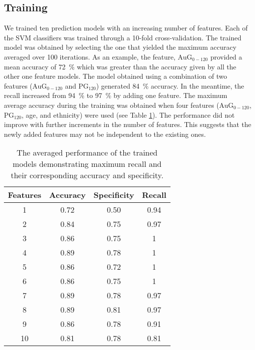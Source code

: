 \documentclass[a4paper,twoside]{article}
\begin{document}
\subsection{Training}
%
We trained ten prediction models with an increasing number of features. Each of the SVM classifiers was trained through a 10-fold cross-validation. The trained model was obtained by selecting the one that yielded the maximum accuracy averaged over \num{100} iterations. As an example, the feature, $\textrm{AuG}_{0-120}$ provided a mean accuracy of \SI{72}{\percent} which was greater than the accuracy given by all the other one feature models. The model obtained using a combination of two features ($\textrm{AuG}_{0-120}$ and $\textrm{PG}_{120}$) generated \SI{84}{\percent} accuracy. In the meantime, the recall increased from \SI{94}{\percent} to \SI{97}{\percent} by adding one feature. The maximum average accuracy during the training was obtained when four features ($\textrm{AuG}_{0-120}$, $\textrm{PG}_{120}$, age, and ethnicity) were used (see Table \ref{tab:train_perf}). The performance did not improve with further increments in the number of features. This suggests that the newly added features may not be independent to the existing ones.
%
\begin{table}[!htbp]
%
\centering
\begin{tabular}{c c c c}
\toprule
Features &  Accuracy & Specificity & Recall\\
\midrule \midrule
	1	& \num{0.72}	& \num{0.50}	& \num{0.94}	\\
	2	& \num{0.84}	& \num{0.75}    & \num{0.97}	\\
	3	& \num{0.86}	& \num{0.75}    & \num{1}		\\
	4	& \num{0.89}	& \num{0.78}	& \num{1}		\\
	5	& \num{0.86}	& \num{0.72}	& \num{1}		\\
	6	& \num{0.86}	& \num{0.75}	& \num{1}		\\
	7	& \num{0.89}	& \num{0.78}	& \num{0.97}    \\
	8	& \num{0.89}	& \num{0.81}	& \num{0.97}	\\
	9	& \num{0.86}	& \num{0.78}	& \num{0.91}	\\
	10	& \num{0.81}	& \num{0.78}	& \num{0.81}	\\
\bottomrule
\end{tabular}
\caption{The averaged performance of the trained models demonstrating maximum recall and their corresponding accuracy and specificity.}
\label{tab:train_perf}
\end{table}
%
\end{document}
